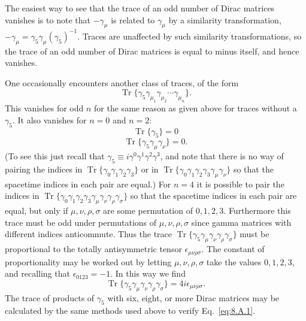The easiest way to see that the trace of an odd number of Dirac matrices
vanishes is to note that $-\gamma_\mu$ is related to $\gamma_\mu$ by a
similarity transformation,
$-\gamma_\mu=\gamma_5\gamma_\mu(\gamma_5)^{-1}$. Traces are unaffected by
such similarity transformations, so the trace of an odd number of Dirac
matrices is equal to minus itself, and hence vanishes.

One occasionally encounters another class of traces, of the form
\[
\operatorname{Tr}\{\gamma_5\gamma_{\mu_1}\gamma_{\mu_2}\cdots
\gamma_{\mu_n}\}.
\]
This vanishes for odd $n$ for the same reason as given above for traces
without a $\gamma_5$. It also vanishes for $n=0$ and $n=2$:
\begin{equation}
\operatorname{Tr}\{\gamma_5\}=0
\tag{8.A.10}\label{eq:8.A.10}
\end{equation}
\begin{equation}
\operatorname{Tr}\{\gamma_5\gamma_\mu\gamma_\nu\}=0.
\tag{8.A.11}\label{eq:8.A.11}
\end{equation}
(To see this just recall that
$\gamma_5\equiv i\gamma^0\gamma^1\gamma^2\gamma^3$, and note that there is no
way of pairing the indices in
$\operatorname{Tr}\{\gamma_0\gamma_1\gamma_2\gamma_3\}$ or in
$\operatorname{Tr}\{\gamma_0\gamma_1\gamma_2\gamma_3\gamma_\mu\gamma_\nu\}$
so that the spacetime indices in each pair are equal.) For $n=4$ it is
possible to pair the indices in
$\operatorname{Tr}\{\gamma_0\gamma_1\gamma_2\gamma_3
\gamma_\mu\gamma_\nu\gamma_\rho\gamma_\sigma\}$ so that the spacetime
indices in each pair are equal, but only if $\mu,\nu,\rho,\sigma$ are some
permutation of $0,1,2,3$. Furthermore this trace must be odd under
permutations of $\mu,\nu,\rho,\sigma$ since gamma matrices with different
indices anticommute. Thus the trace
$\operatorname{Tr}\{\gamma_5\gamma_\mu\gamma_\nu\gamma_\rho\gamma_\sigma\}$
must be proportional to the totally antisymmetric tensor
$\epsilon_{\mu\nu\rho\sigma}$. The constant of proportionality may be worked
out by letting $\mu,\nu,\rho,\sigma$ take the values $0,1,2,3$, and recalling
that $\epsilon_{0123}=-1$. In this way we find
\begin{equation}
\operatorname{Tr}\{\gamma_5\gamma_\mu\gamma_\nu\gamma_\rho\gamma_\sigma\}
=4i\epsilon_{\mu\nu\rho\sigma}.
\tag{8.A.12}\label{eq:8.A.12}
\end{equation}
The trace of products of $\gamma_5$ with six, eight, or more Dirac matrices
may be calculated by the same methods used above to verify Eq.~\eqref{eq:8.A.1}.
